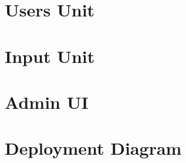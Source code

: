 \documentclass[]{article}
\begin{document}
    \section{Users Unit}
    
    \newpage
    
    \section{Input Unit}
    
    \newpage
    
    \section{Admin UI}
    
    \newpage
    
    \section{Deployment Diagram}
   
    \newpage
\end{document}
